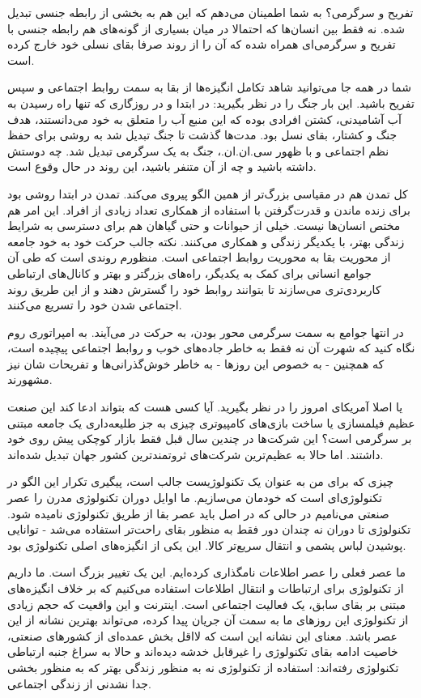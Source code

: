 تفریح و سرگرمی؟ به شما اطمینان می‌دهم که این هم به بخشی از رابطه جنسی
تبدیل شده. نه فقط بین انسان‌ها که احتمالا در میان بسیاری از گونه‌های
 هم رابطه جنسی با تفریح و سرگرمی‌ای همراه شده که آن را از
روند صرفا بقای نسلی خود خارج کرده است.

شما در همه جا می‌توانید شاهد تکامل انگیزه‌ها از بقا به سمت روابط اجتماعی
و سپس تفریح باشید. این بار جنگ را در نظر بگیرید: در ابتدا و در روزگاری
که تنها راه رسیدن به آب‌ آشامیدنی،‌ کشتن افرادی بوده که این منبع آب را
متعلق به خود می‌دانستند، هدف جنگ و کشتار، بقای نسل بود. مدت‌ها گذشت تا
جنگ تبدیل شد به روشی برای حفظ نظم اجتماعی و با ظهور سی.ان.ان.، جنگ به
یک سرگرمی تبدیل شد. چه دوستش داشته باشید و چه از آن متنفر باشید، این
روند در حال وقوع است.

کل تمدن هم در مقیاسی بزرگ‌تر از همین الگو پیروی می‌کند. تمدن در ابتدا
روشی بود برای زنده ماندن و قدرت‌گرفتن با استفاده از همکاری تعداد زیادی
از افراد. این امر هم مختص انسان‌ها نیست. خیلی از حیوانات و حتی گیاهان
هم برای دسترسی به شرایط زندگی بهتر، با یکدیگر زندگی و همکاری
می‌کنند. نکته جالب حرکت خود به خود جامعه از محوریت بقا به محوریت روابط
اجتماعی است. منظورم روندی است که طی آن جوامع انسانی برای کمک به
یکدیگر، راه‌های بزرگتر و بهتر و کانال‌های ارتباطی کاربردی‌تری می‌سازند تا
بتوانند روابط خود را گسترش دهند و از این طریق روند اجتماعی شدن خود را
تسریع می‌کنند.

در انتها جوامع به سمت سرگرمی محور بودن، به حرکت در می‌آیند. به
امپراتوری روم نگاه کنید که شهرت آن نه فقط به خاطر جاده‌های خوب و روابط
اجتماعی پیچیده است، که همچنین - به خصوص این روزها - به خاطر
خوش‌گذرانی‌ها و تفریحات شان نیز مشهورند.

یا اصلا آمریکای امروز را در نظر بگیرید. آیا کسی هست که بتواند ادعا کند
این صنعت عظیم فیلمسازی یا ساخت بازی‌های کامپیوتری چیزی به جز طلیعه‌داری
یک جامعه مبتنی بر سرگرمی است؟ این شرکت‌ها در چندین سال قبل فقط بازار
کوچکی پیش روی خود داشتند. اما حالا به عظیم‌ترین شرکت‌های ثروتمندترین
کشور جهان تبدیل شده‌اند.

چیزی که برای من به عنوان یک تکنولوژیست جالب است، پیگیری تکرار این الگو
در تکنولوژی‌ای است که خودمان می‌سازیم. ما اوایل دوران تکنولوژی مدرن را
عصر صنعتی می‌نامیم در حالی که در اصل باید عصر بقا از طریق تکنولوژی
نامیده شود. تکنولوژی تا دوران نه چندان دور فقط به منظور بقای راحت‌تر
استفاده می‌شد - توانایی پوشیدن لباس پشمی و انتقال سریع‌تر کالا. این یکی
از انگیزه‌های اصلی تکنولوژی بود.

ما عصر فعلی را عصر اطلاعات نامگذاری کرده‌ایم. این یک تغییر بزرگ است. ما
داریم از تکنولوژی برای ارتباطات و انتقال اطلاعات استفاده می‌کنیم که بر
خلاف انگیزه‌های مبتنی بر بقای سابق، یک فعالیت اجتماعی است. اینترنت و
این واقعیت که حجم زیادی از تکنولوژی این روزهای ما به سمت آن جریان پیدا
کرده، می‌تواند بهترین نشانه از این عصر باشد. معنای این نشانه این است که
لااقل بخش عمده‌ای از کشورهای صنعتی، خاصیت ادامه بقای تکنولوژی را
غیرقابل خدشه دیده‌اند و حالا به سراغ جنبه ارتباطی تکنولوژی رفته‌اند:
استفاده از تکنولوژی نه به منظور زندگی بهتر که به منظور بخشی جدا نشدنی
از زندگی اجتماعی.

